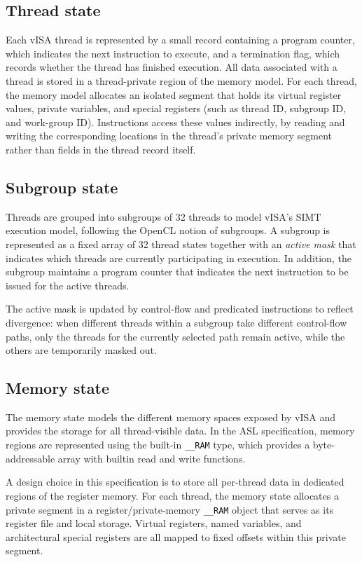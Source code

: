 \subsection{Thread state}

Each vISA thread is represented by a small record containing a program counter,
which indicates the next instruction to execute, and a termination flag, which
records whether the thread has finished execution. All data associated with a
thread is stored in a thread-private region of the memory model. For each
thread, the memory model allocates an isolated segment that holds its virtual
register values, private variables, and special registers (such as thread ID,
subgroup ID, and work-group ID). Instructions access these values indirectly,
by reading and writing the corresponding locations in the thread’s private
memory segment rather than fields in the thread record itself.

\subsection{Subgroup state}
Threads are grouped into subgroups of 32 threads to model vISA's SIMT execution
model, following the OpenCL notion of subgroups. A subgroup is represented as a
fixed array of 32 thread states together with an \emph{active mask} that
indicates which threads are currently participating in execution. In addition,
the subgroup maintains a program counter that indicates the next instruction to
be issued for the active threads.

The active mask is updated by control-flow and predicated instructions to
reflect divergence: when different threads within a subgroup take different
control-flow paths, only the threads for the currently selected path remain
active, while the others are temporarily masked out.

\subsection{Memory state}
The memory state models the different memory spaces exposed by vISA and
provides the storage for all thread-visible data. In the ASL specification,
memory regions are represented using the built-in \lstinline{__RAM} type, which
provides a byte-addressable array with builtin read and write functions.

A design choice in this specification is to store all per-thread data in
dedicated regions of the register memory. For each thread, the memory state
allocates a private segment in a register/private-memory \lstinline{__RAM}
object that serves as its register file and local storage. Virtual registers,
named variables, and architectural special registers are all mapped to fixed
offsets within this private segment.

